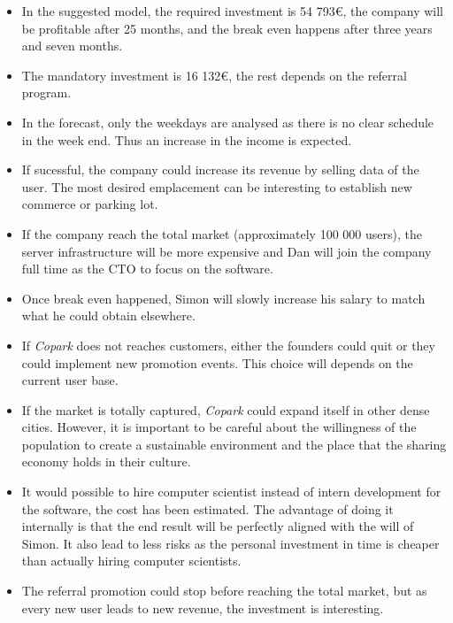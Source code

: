 \documentclass[12pt,a4paper,oneside]{book}
\newcommand{\bp}{\textit{Copark }}
\begin{document}
\begin{itemize}
\item In the suggested model, the required investment is 54 793\euro{}, the company will be profitable after 25 months, and the break even happens after three years and seven months.
\item The mandatory investment is 16 132\euro{}, the rest depends on the referral program.
\item In the forecast, only the weekdays are analysed as there is no clear schedule in the week end. Thus an increase in the income is expected.
\item If sucessful, the company could increase its revenue by selling data of the user. The most desired emplacement can be interesting to establish new commerce or parking lot.
\item If the company reach the total market (approximately 100 000 users), the server infrastructure will be more expensive and Dan will join the company full time as the CTO to focus on the software.
\item Once break even happened, Simon will slowly increase his salary to match what he could obtain elsewhere. 
\item If \bp does not reaches customers, either the founders could quit or they could implement new promotion events. This choice will depends on the current user base.
\item If the market is totally captured, \bp could expand itself in other dense cities. However, it is important to be careful about the willingness of the population to create a sustainable environment and the place that the sharing economy holds in their culture.
\item It would possible to hire computer scientist instead of intern development for the software, the cost has been estimated. The advantage of doing it internally is that the end result will be perfectly aligned with the will of Simon. It also lead to less risks as the personal investment in time is cheaper than actually hiring computer scientists.
\item The referral promotion could stop before reaching the total market, but as every new user leads to new revenue, the investment is interesting.
\end{itemize}


\appendix
\end{document}
